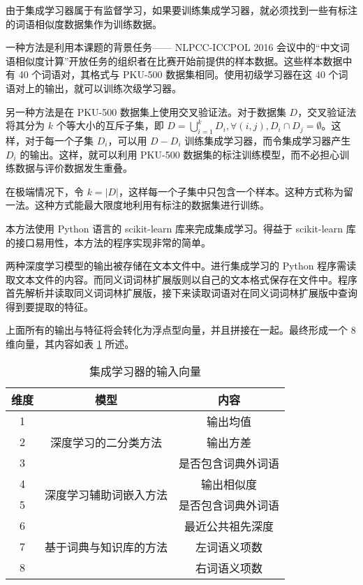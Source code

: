 由于集成学习器属于有监督学习，如果要训练集成学习器，就必须找到一些有标注的词语相似度数据集作为训练数据。

一种方法是利用本课题的背景任务—— NLPCC-ICCPOL 2016 会议中的“中文词语相似度计算”开放任务的组织者在比赛开始前提供的样本数据。这些样本数据中有 40 个词语对，其格式与 PKU-500 数据集相同。使用初级学习器在这 40 个词语对上的输出，就可以训练次级学习器。

另一种方法是在 PKU-500 数据集上使用交叉验证法。对于数据集 $D$，交叉验证法将其分为 $k$ 个等大小的互斥子集，即 $D = \bigcup_{i = 1}^k D_i, \forall (i, j), D_i \cap D_j = \emptyset$。这样，对于每一个子集 $D_i$，可以用 $D - D_i$ 训练集成学习器，而令集成学习器产生 $D_i$ 的输出。这样，就可以利用 PKU-500 数据集的标注训练模型，而不必担心训练数据与评价数据发生重叠。

在极端情况下，令 $k = |D|$，这样每一个子集中只包含一个样本。这种方式称为留一法。这种方式能最大限度地利用有标注的数据集进行训练。

本方法使用 Python 语言的 scikit-learn 库来完成集成学习。得益于 scikit-learn 库的接口易用性，本方法的程序实现非常的简单。

两种深度学习模型的输出被存储在文本文件中。进行集成学习的 Python 程序需读取文本文件的内容。而同义词词林扩展版则以自己的文本格式保存在文件中。程序首先解析并读取同义词词林扩展版，接下来读取词语对在同义词词林扩展版中查询得到要提取的特征。

上面所有的输出与特征将会转化为浮点型向量，并且拼接在一起。最终形成一个 8 维向量，其内容如表 \ref{t:features} 所述。

\begin{table}[h]
	\caption{集成学习器的输入向量}
	\label{t:features}
	\vspace{0.5em}\centering\wuhao
	\begin{tabular}{ccc}
		\toprule[1.5pt]
		维度 & 模型 & 内容 \\
		\midrule[1pt]
		1 & \multirow{3}{*}{深度学习的二分类方法} & 输出均值 \\
		2 &  & 输出方差 \\
		3 &  & 是否包含词典外词语 \\
		\hline
		4 & \multirow{2}{*}{深度学习辅助词嵌入方法} & 输出相似度 \\
		5 &  & 是否包含词典外词语 \\
		\hline
		6 & \multirow{3}{*}{基于词典与知识库的方法} & 最近公共祖先深度 \\
		7 &  & 左词语义项数 \\
		8 &  & 右词语义项数 \\
		\bottomrule[1.5pt]
	\end{tabular}
\end{table}

